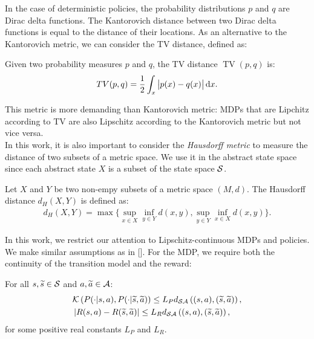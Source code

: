 \noindent In the case of deterministic policies, the probability distributions $p$ and $q$ are Dirac delta functions. The Kantorovich distance between two Dirac delta functions is equal to the distance of their locations. As an alternative to the Kantorovich metric, we can consider the \acf{TV} distance, defined as:
\begin{definition}
	Given two probability measures $p$ and $q$, the \ac{TV} distance $\mathop{TV}(p, q)$ is:
	\begin{align} \mathop{TV}(p, q) = \frac{1}{2} \int_x \big|p(x)-q(x)\big| \,\mathrm{d} x. \label{eq:tv}\end{align}
\end{definition}
\noindent This metric is more demanding than Kantorovich metric: \ac{MDPs} that are Lipchitz according to \ac{TV} are also Lipschitz according to the Kantorovich metric but not vice versa.\\
\newline
In this work, it is also important to consider the \emph{Hausdorff metric} to measure the distance of two subsets of a metric space. We use it in the abstract state space since each abstract state $X$ is a subset of the state space $\mathcal{S}$.
\begin{definition}
	Let $X$ and $Y$ be two non-empy subsets of a metric space $(M,d)$. The Hausdorff distance $d_{H}(X,Y)$ is defined as:
	\begin{align}
		d_{H}(X,Y) = \max \Big\{\sup_{x \in X}\inf_{y \in Y}d(x, y), \sup_{y \in Y}\inf_{x \in X}d(x,y)\Big\}.
	\end{align}
\end{definition}
\noindent In this work, we restrict our attention to Lipschitz-continuous \ac{MDPs} and policies. We make similar assumptions as in [\cite{pirotta2015policy}]. For the \ac{MDP}, we require both the continuity of the transition model and the reward:
%
\begin{assumption}\label{ass:lipmdp}
	For all $s,\widetilde{s}\in\mathcal{S}$ and $a,\widetilde{a}\in\mathcal{A}$:
	\begin{align}
	&\mathcal{K}\left(P(\cdot|s,a), P(\cdot| \widetilde{s},\widetilde{a})\right) \leq L_{P}d_{\mathcal{S}\mathcal{A}}\left((s,a),(\widetilde{s},\widetilde{a})\right), \label{eq:liptf}\\
	&\left|R(s,a) - R(\widetilde{s},\widetilde{a})\right| \leq L_{R}d_{\mathcal{S}\mathcal{A}}\left((s,a),(\widetilde{s},\widetilde{a})\right),
	\end{align}
	for some positive real constants $L_{P}$ and $L_{R}$.
\end{assumption}
